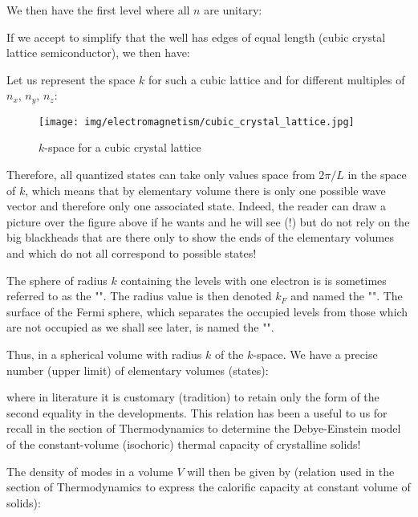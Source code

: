 	We then have the first level where all $n$ are unitary:
	
	If we accept to simplify that the well has edges of equal length (cubic crystal lattice semiconductor), we then have:
	
	Let us represent the space $k$ for such a cubic lattice and for different multiples of $n_x$, $n_y$, $n_z$:
	\begin{figure}[H]
		\centering
		\texttt{[image: img/electromagnetism/cubic\_crystal\_lattice.jpg]}
		\caption{$k$-space for a cubic crystal lattice}
	\end{figure}
	Therefore, all quantized states can take only values space from $2\pi/L$ in the space of $k$, which means that by elementary volume there is only one possible wave vector and therefore only one associated state. Indeed, the reader can draw a picture over the figure above if he wants and he will see (!) but do not rely on the big blackheads that are there only to show the ends of the elementary volumes and which do not all correspond to possible states!
	\begin{tcolorbox}[title=Remark,colframe=black,arc=10pt]
	The sphere of radius $k$ containing the levels with one electron is is sometimes referred to as the "". The radius value is then denoted $k_F$ and named the "". The surface of the Fermi sphere, which separates the occupied levels from those which are not occupied as we shall see later, is named the "".
	\end{tcolorbox}	
	Thus, in a spherical volume with radius $k$ of the $k$-space. We have a precise number (upper limit) of elementary volumes (states):
	
	where in literature it is customary (tradition) to retain only the form of the second equality in the developments. This relation has been a useful to us for recall in the section of Thermodynamics to determine the Debye-Einstein model of the constant-volume (isochoric) thermal capacity of crystalline solids!

	The density of modes in a volume $V$ will then be given by (relation used in the section of Thermodynamics to express the calorific capacity at constant volume of solids):
	
